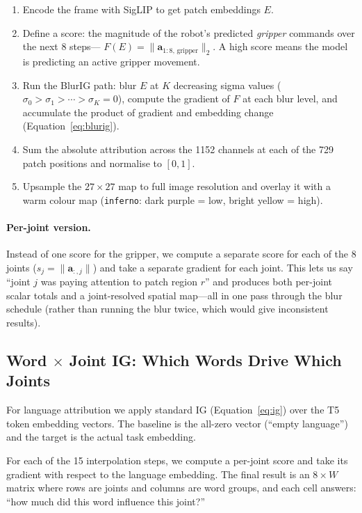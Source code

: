 \documentclass[11pt,a4paper]{article}
\begin{document}
\begin{enumerate}
    \item Encode the frame with SigLIP to get patch embeddings $E$.
    \item Define a score: the magnitude of the robot's predicted
          \emph{gripper} commands over the next 8 steps---
          $F(E) = \|\mathbf{a}_{1:8,\,\text{gripper}}\|_2$.
          A high score means the model is predicting an active gripper movement.
    \item Run the BlurIG path: blur $E$ at $K$ decreasing sigma values
          ($\sigma_0 > \sigma_1 > \cdots > \sigma_K = 0$), compute the
          gradient of $F$ at each blur level, and accumulate the product
          of gradient and embedding change (Equation~\ref{eq:blurig}).
    \item Sum the absolute attribution across the 1152 channels at each
          of the 729 patch positions and normalise to $[0, 1]$.
    \item Upsample the $27 \times 27$ map to full image resolution and
          overlay it with a warm colour map (\texttt{inferno}: dark purple =
          low, bright yellow = high).
\end{enumerate}

\paragraph{Per-joint version.}
Instead of one score for the gripper, we compute a separate score for
each of the 8 joints ($s_j = \|\mathbf{a}_{:,j}\|$) and take a separate
gradient for each joint. This lets us say ``joint $j$ was paying attention
to patch region $r$'' and produces both per-joint scalar totals and
a joint-resolved spatial map---all in one pass through the blur schedule
(rather than running the blur twice, which would give inconsistent results).

\subsection{Word $\times$ Joint IG: Which Words Drive Which Joints}

For language attribution we apply standard IG (Equation~\ref{eq:ig}) over
the T5 token embedding vectors. The baseline is the all-zero vector
(``empty language'') and the target is the actual task embedding.

For each of the 15 interpolation steps, we compute a per-joint score
and take its gradient with respect to the language embedding. The final
result is an $8 \times W$ matrix where rows are joints and columns
are word groups, and each cell answers: ``how much did this word
influence this joint?''
\end{document}
